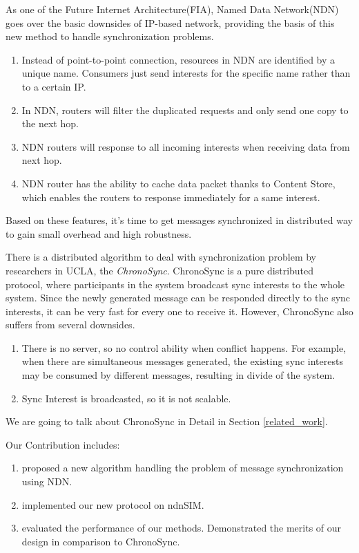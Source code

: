 \documentclass[conference]{IEEEtran}
\begin{document}
As one of the Future Internet Architecture(FIA)\cite{FIA},
Named Data Network(NDN)\cite{NDN001} goes over the basic downsides of IP-based network,
providing the basis of this new method to handle synchronization problems.
\begin{enumerate}{}
	\item Instead of point-to-point connection, resources in NDN are identified by a unique name.
Consumers just send interests for the specific name rather than to a certain IP.
	\item In NDN, routers will filter the duplicated requests and only send one copy to the next hop.
	\item NDN routers will response to all incoming interests when receiving data from next hop.
	\item NDN router has the ability to cache data packet thanks to Content Store,
which enables the routers to response immediately for a same interest.
\end{enumerate}
Based on these features, it's time to get messages synchronized in distributed way
to gain small overhead and high robustness.

There is a distributed algorithm to deal with synchronization problem by researchers in UCLA, the
\emph{ChronoSync\cite{ChronoSync}}.
ChronoSync is a pure distributed protocol,
where participants in the system broadcast sync interests to the whole system.
Since the newly generated message can be responded directly to the sync interests,
it can be very fast for every one to receive it.
However, ChronoSync also suffers from several downsides.
\begin{enumerate}{}
	\item There is no server, so no control ability when conflict happens.
For example, when there are simultaneous messages generated,
the existing sync interests may be consumed by different messages,
resulting in divide of the system.
	\item Sync Interest is broadcasted, so it is not scalable.
\end{enumerate}
We are going to talk about ChronoSync in Detail in Section \ref{related_work}.

Our Contribution includes:
\begin{enumerate}{}
	\item proposed a new algorithm handling the problem of message synchronization using NDN.
	\item implemented our new protocol on ndnSIM\cite{ndnSIM}.
	\item evaluated the performance of our methods.
Demonstrated the merits of our design in comparison to ChronoSync.
\end{enumerate}
\end{document}
